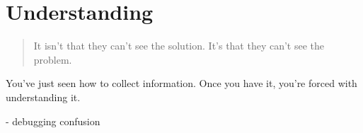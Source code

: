\chapter{Understanding}

\begin{quote}
It isn't that they can't see the solution. It's that they can't see the problem.
\end{quote}

You've just seen how to collect information. Once you have it, you're forced with understanding it.

- debugging confusion
